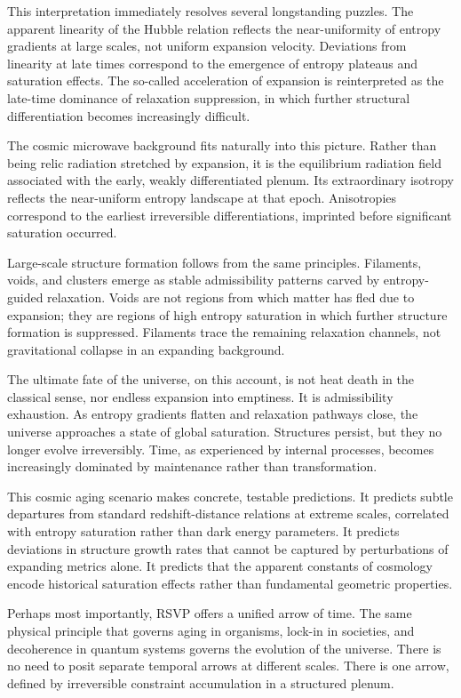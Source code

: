 \documentclass[11pt,oneside]{book}
\begin{document}
This interpretation immediately resolves several longstanding puzzles. The apparent linearity of the Hubble relation reflects the near-uniformity of entropy gradients at large scales, not uniform expansion velocity. Deviations from linearity at late times correspond to the emergence of entropy plateaus and saturation effects. The so-called acceleration of expansion is reinterpreted as the late-time dominance of relaxation suppression, in which further structural differentiation becomes increasingly difficult.

The cosmic microwave background fits naturally into this picture. Rather than being relic radiation stretched by expansion, it is the equilibrium radiation field associated with the early, weakly differentiated plenum. Its extraordinary isotropy reflects the near-uniform entropy landscape at that epoch. Anisotropies correspond to the earliest irreversible differentiations, imprinted before significant saturation occurred.

Large-scale structure formation follows from the same principles. Filaments, voids, and clusters emerge as stable admissibility patterns carved by entropy-guided relaxation. Voids are not regions from which matter has fled due to expansion; they are regions of high entropy saturation in which further structure formation is suppressed. Filaments trace the remaining relaxation channels, not gravitational collapse in an expanding background.

The ultimate fate of the universe, on this account, is not heat death in the classical sense, nor endless expansion into emptiness. It is admissibility exhaustion. As entropy gradients flatten and relaxation pathways close, the universe approaches a state of global saturation. Structures persist, but they no longer evolve irreversibly. Time, as experienced by internal processes, becomes increasingly dominated by maintenance rather than transformation.

This cosmic aging scenario makes concrete, testable predictions. It predicts subtle departures from standard redshift-distance relations at extreme scales, correlated with entropy saturation rather than dark energy parameters. It predicts deviations in structure growth rates that cannot be captured by perturbations of expanding metrics alone. It predicts that the apparent constants of cosmology encode historical saturation effects rather than fundamental geometric properties.

Perhaps most importantly, RSVP offers a unified arrow of time. The same physical principle that governs aging in organisms, lock-in in societies, and decoherence in quantum systems governs the evolution of the universe. There is no need to posit separate temporal arrows at different scales. There is one arrow, defined by irreversible constraint accumulation in a structured plenum.
\end{document}
